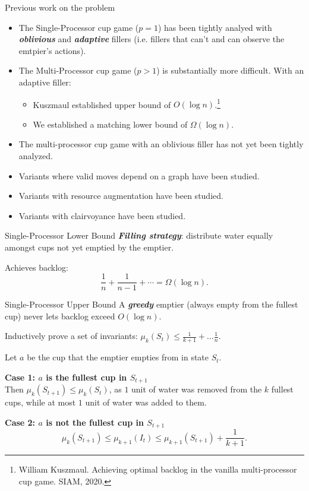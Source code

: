 \documentclass[xcolor=x11names, svgnames, rgb]{beamer}
\newcommand{\defn}[1]       {{\textit{\textbf{\boldmath #1}}}}
\begin{document}
\begin{frame}[t]{Previous work on the problem}
  \begin{itemize}
    \item The Single-Processor cup game ($p=1$) has been tightly analyed with
      \defn{oblivious} and \defn{adaptive} fillers (i.e. fillers that can't and
      can observe the emtpier's actions).
    \item The Multi-Processor cup game ($p>1$) is substantially more difficult. With an adaptive filler:
      \begin{itemize}
        \item Kuszmaul established upper bound of $O(\log n)$.\footnote{\tiny\color{blue}William Kuszmaul. Achieving optimal backlog in the vanilla multi-processor cup game. SIAM, 2020.}
        \item We established a matching lower bound of $\Omega(\log n)$.
      \end{itemize}
    \item The multi-processor cup game with an oblivious filler has not yet
      been tightly analyzed.
    \item Variants where valid moves depend on a graph have been studied.
    \item Variants with resource augmentation have been studied.
    \item Variants with clairvoyance have been studied.
  \end{itemize}
\end{frame}

\begin{frame}[t]{Single-Processor Lower Bound}
  \defn{Filling strategy}: distribute water equally amongst cups not yet emptied by the emptier.
  \vspace{1.5cm}

  Achieves backlog:
  $$\frac{1}{n} + \frac{1}{n-1} + \cdots = \Omega(\log n).$$
\end{frame}

\begin{frame}[t]{Single-Processor Upper Bound}
  A \defn{greedy} emptier (always empty from the fullest cup) never lets backlog exceed $O(\log n)$.
  \vspace{0.25cm}

  Inductively prove a set of invariants: $\mu_k(S_t) \le \frac{1}{k+1} + \ldots \frac{1}{n}$.

  Let $a$ be the cup that the emptier empties from in state $S_{t}$.

  \textbf{Case 1: $a$ is the fullest cup in $S_{t+1}$}\\
  Then $\mu_k(S_{t+1}) \le \mu_k(S_t)$, as $1$ unit of water was removed from
  the $k$ fullest cups, while at most $1$ unit of water was added to them.

  \textbf{Case 2: $a$ is not the fullest cup in $S_{t+1}$}
  $$\mu_k(S_{t+1}) \le \mu_{k+1}(I_t) \le \mu_{k+1}(S_{t+1}) + \frac{1}{k+1}.$$

\end{frame}
\end{document}

